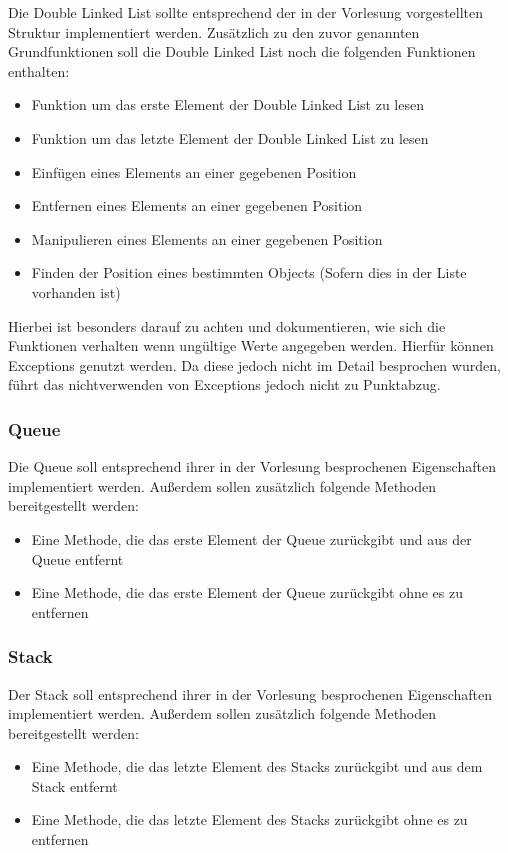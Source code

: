 \documentclass[a4paper,
			   fontsize=12pt]{article}
\begin{document}
Die Double Linked List sollte entsprechend der in der Vorlesung vorgestellten Struktur implementiert werden. Zusätzlich zu den zuvor genannten Grundfunktionen soll die Double Linked List noch die folgenden Funktionen enthalten:
\begin{itemize}
	\item Funktion um das erste Element der Double Linked List zu lesen
	\item Funktion um das letzte Element der Double Linked List zu lesen
	\item Einfügen eines Elements an einer gegebenen Position
	\item Entfernen eines Elements an einer gegebenen Position
	\item Manipulieren eines Elements an einer gegebenen Position
	\item Finden der Position eines bestimmten Objects (Sofern dies in der Liste vorhanden ist)
\end{itemize}

Hierbei ist besonders darauf zu achten und dokumentieren, wie sich die Funktionen verhalten wenn ungültige Werte angegeben werden. Hierfür können Exceptions genutzt werden. Da diese jedoch nicht im Detail besprochen
wurden, führt das nichtverwenden von Exceptions jedoch nicht zu Punktabzug.

\subsubsection*{Queue}
Die Queue soll entsprechend ihrer in der Vorlesung besprochenen Eigenschaften implementiert werden. Außerdem sollen zusätzlich folgende Methoden bereitgestellt werden:
\begin{itemize}
	\item Eine Methode, die das erste Element der Queue zurückgibt und aus der Queue entfernt
	\item Eine Methode, die das erste Element der Queue zurückgibt ohne es zu entfernen
\end{itemize}

\subsubsection*{Stack}
Der Stack soll entsprechend ihrer in der Vorlesung besprochenen Eigenschaften implementiert werden. Außerdem sollen zusätzlich folgende Methoden bereitgestellt werden:
\begin{itemize}
	\item Eine Methode, die das letzte Element des Stacks zurückgibt und aus dem Stack entfernt
	\item Eine Methode, die das letzte Element des Stacks zurückgibt ohne es zu entfernen
\end{itemize}
\end{document}
